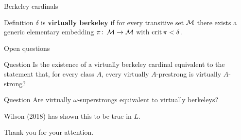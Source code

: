 \begin{frame}{Berkeley cardinals}
  \begin{block}{Definition}
    $\delta$ is \textbf{virtually berkeley} if for every transitive set $\operatorname{\mathcal M}$ there exists a generic elementary embedding $\pi\colon\operatorname{\mathcal M}\to\operatorname{\mathcal M}$ with $\operatorname{crit}\pi<\delta$.
  \end{block}



\end{frame}

\begin{frame}{Open questions}
  \begin{block}{Question}
    Is the existence of a virtually berkeley cardinal equivalent to the statement that, for every class $A$, every virtually $A$-prestrong is virtually $A$-strong?
  \end{block}

  \begin{block}{Question}
    Are virtually $\omega$-superstrongs equivalent to virtually berkeleys?

    Wilson (2018) has shown this to be true in $L$.
  \end{block}
\end{frame}

{
\begin{frame}
  \phantom{hidden text}
  \begin{center}
    {\LARGE Thank you for your attention.}
  \end{center}

\end{frame}}


